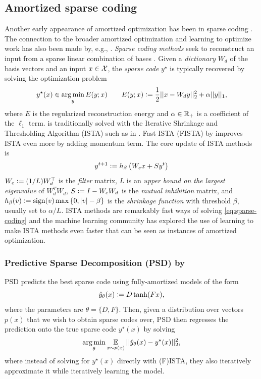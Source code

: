 \documentclass[twoside,11pt]{article}
\newcommand{\eg}{e.g.\xspace}
\begin{document}
\subsection{Amortized sparse coding}
\label{sec:apps:lista}
Another early appearance of amortized optimization has been in
sparse coding \citep{kavukcuoglu2010fast,gregor2010learning}.
The connection to the broader amortized optimization and
learning to optimize work has also been made by,
\eg, \citet{chen2021learning}.
\emph{Sparse coding methods} seek to reconstruct an input
from a sparse linear combination of bases
\citep{olshausen1996emergence,chen2001atomic,donoho2003optimally}.
Given a \emph{dictionary} $W_d$ of the basis vectors
and an input $x\in{\mathcal{X}}$, the \emph{sparse code} $y^\star$ is
typically recovered by solving the optimization problem
\begin{equation}
  y^\star(x) \in \operatorname*{arg\,min}_y E(y; x) \qquad
  E(y; x)\vcentcolon= \frac{1}{2}||x-W_dy||_2^2 + \alpha||y||_1,
  \label{eq:sparse-coding}
\end{equation}
where $E$ is the regularized reconstruction energy
and $\alpha\in\mathbb{R}_+$ is a coefficient of the $\ell_1$ term.
 is traditionally solved
with the Iterative Shrinkage and Thresholding Algorithm (ISTA)
such as in \citet{daubechies2004iterative}.
Fast ISTA (FISTA) by \citet{beck2009fast} improves ISTA even more
by adding momentum term.
The core update of ISTA methods is
\begin{equation}
  y^{t+1}\vcentcolon= h_\beta\left(W_ex + Sy^t\right)
  \label{eq:ista}
\end{equation}
$W_e\vcentcolon= (1/L)W_d^\top$ is the \emph{filter} matrix,
$L$ is an \emph{upper bound on the largest eigenvalue} of $W_d^T W_d$,
$S\vcentcolon= I-W_eW_d$ is the \emph{mutual inhibition} matrix,
and
$h_\beta(v)\vcentcolon=\operatorname{sign}(v)\max\left\{0, |v|-\beta\right\}$
is the \emph{shrinkage function} with threshold $\beta$, usually
set to $\alpha/L$.
ISTA methods are remarkably fast ways of solving
\cref{eq:sparse-coding} and
the machine learning community has explored the use
of learning to make ISTA methods even faster
that can be seen as instances of amortized optimization.

\subsubsection{Predictive Sparse Decomposition (PSD) by \citet{kavukcuoglu2010fast}}
PSD predicts the best sparse code using fully-amortized models
of the form
\begin{equation}
  \hat y_\theta(x) \vcentcolon= D\tanh(Fx),
  \label{eq:fast-ista}
\end{equation}
where the parameters are $\theta=\{D,F\}$.
Then, given a distribution over vectors $p(x)$
that we wish to obtain sparse codes over,
PSD then regresses the prediction onto the true sparse code $y^\star(x)$
by solving
\begin{equation}
  \operatorname*{arg\,min}_\theta \operatorname*{\mathbb{E}}_{x\sim p(x)} ||\hat y_\theta(x) - y^\star(x)||_2^2,
  \label{eq:psd-loss}
\end{equation}
where instead of solving for $y^\star(x)$ directly
with (F)ISTA, they also iteratively approximate it while
iteratively learning the model.
\end{document}
